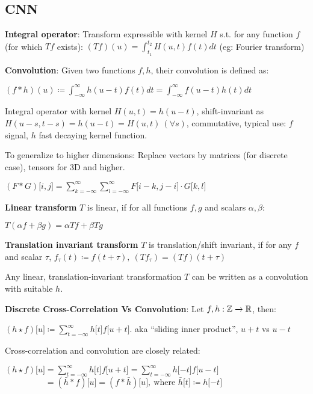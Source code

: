 \subsection{CNN}
\label{sub:cnn}
    \textbf{Integral operator}: Transform expressible with kernel $H$ s.t. for any function $f$ (for which $Tf$ exists): $(Tf)(u)=\int^{t_2}_{t_1}H(u,t)f(t)dt$ (eg: Fourier transform)
    
    \textbf{Convolution}: Given two functions $f,h$, their convolution is defined as:
    
    \tab $(f*h)(u)\coloneqq\int_{-\infty}^{\infty}h(u-t)f(t)dt=\int_{-\infty}^{\infty}f(u-t)h(t)dt $
    
    Integral operator with kernel $H(u,t)=h(u-t)$, shift-invariant as $H(u-s,t-s)=h(u-t)=H(u,t)\>(\forall s)$, commutative, typical use: $f$ signal, $h$ fast decaying kernel function.
    
    To generalize to higher dimensions: Replace vectors by matrices (for discrete case), tensors for 3D and higher.
    
    \tab $(F*G)\lbrack i,j \rbrack = \sum^\infty_{k=-\infty}\sum^\infty_{l=-\infty}F\lbrack i-k, j-i \rbrack \cdot G\lbrack k,l \rbrack$
    
    \textbf{Linear transform} $T$ is linear, if for all functions $f,g$ and scalars $\alpha,\beta$: 
    
    \tab$T(\alpha f+\beta g)=\alpha Tf+\beta Tg$
    
    \textbf{Translation invariant transform} $T$ is translation/shift invariant, if for any $f$ and scalar $\tau$,
    \tab$f_\tau(t)\coloneqq f(t+\tau),\>(Tf_\tau)=(Tf)(t+\tau)$
    
    Any linear, translation-invariant transformation $T$ can be written as a convolution with suitable $h$.
    
    \textbf{Discrete Cross-Correlation Vs Convolution}: Let $f,h:\mathbb{Z}\xrightarrow{}\mathbb R$, then:
    
    \tab$(h\star f)\lbrack u \rbrack\coloneqq\sum\limits^\infty_{t=-\infty}h\lbrack t \rbrack f \lbrack u+t \rbrack$. aka ``sliding inner product'', $u+t$ vs $u-t$
    
    Cross-correlation and convolution are closely related:
    
    \tab$(h\star f)\lbrack u \rbrack=\sum\limits^\infty_{t=-\infty}h\lbrack t \rbrack f \lbrack u+t \rbrack=\sum\limits^\infty_{t=-\infty}h\lbrack -t \rbrack f \lbrack u-t \rbrack$\\
    \tab$\phantom{(h\star f)\lbrack u \rbrack}=(\bar{h}*f)\lbrack u \rbrack=(f*\bar{h})\lbrack u \rbrack,\>\text{where } \bar{h}\lbrack t \rbrack\coloneqq h\lbrack -t\rbrack$
    
